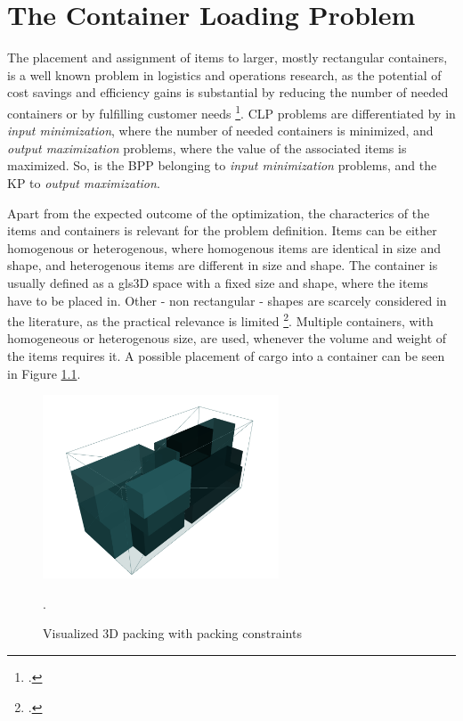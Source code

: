 \chapter{The Container Loading Problem}
\label{sec:clp_definition}

The placement and assignment of items to larger, mostly rectangular
containers, is a well known problem in logistics and operations research, as the
potential of cost savings and efficiency gains is substantial by reducing the number
of needed containers or by fulfilling customer needs \footcite[cf.][p.1]{bortfeldt_constraints_2013}.
\gls{CLP} problems are differentiated by \cite{bortfeldt_constraints_2013} in \textit{input minimization},
where the number of needed containers is minimized, and \textit{output maximization} problems,
where the value of the associated items is maximized. So, is the \gls{BPP} belonging
to \textit{input minimization} problems, and the \gls{KP} to \textit{output maximization}.

Apart from the expected outcome of the optimization, the characterics of the items
and containers is relevant for the problem definition. Items can be either homogenous or heterogenous,
where homogenous items are identical in size and shape, and heterogenous items are
different in size and shape. The container is usually defined as a gls{3D} space
with a fixed size and shape, where the items have to be placed in.
Other - non rectangular - shapes are scarcely considered in the literature, as the practical relevance is
limited \footcite[cf.][p.1-2]{bortfeldt_constraints_2013}. Multiple containers, with homogeneous
or heterogenous size,  are used, whenever the volume and weight of the items requires it.
A possible placement of cargo into a container can be seen in Figure \ref{fig:solution-visualization}.

\begin{figure}[ht]
    \centering
    \includegraphics[width=7cm]{pictures/3l_cvrp_example.png}
    \caption[Visualized 3D packing with packing constraints]{Visualized 3D packing with packing constraints\footnotemark}.
    \label{fig:solution-visualization}
\end{figure}

